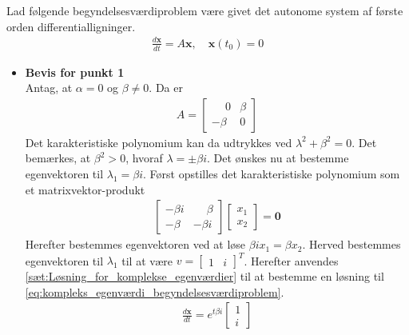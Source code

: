 \begin{bev} \textbf{}
\newline
Lad følgende begyndelsesværdiproblem være givet det autonome system af første orden differentialligninger.
    \begin{align}
        \frac{d\textbf{x}}{dt}=A\textbf{x}, \quad \textbf{x}(t_0)=0 \label{eq:kompleks_egenværdi_begyndelsesværdiproblem}
    \end{align}
\begin{itemize}
    \item[] \textbf{Bevis for punkt 1}\\
    Antag, at $\alpha = 0$ og $\beta \neq 0$. Da er
    \begin{align*}
        A = \begin{bmatrix}
            \phantom{-}0 & \beta \\
            -\beta & 0
    \end{bmatrix}
    \end{align*}
    Det karakteristiske polynomium kan da udtrykkes ved $\lambda^2+\beta^2=0$. Det bemærkes, at $\beta^2>0$, hvoraf $\lambda=\pm\beta i$. Det ønskes nu at bestemme egenvektoren til $\lambda_1 = \beta i$. Først opstilles det karakteristiske polynomium som et matrixvektor-produkt %
    \begin{align*}
        \begin{bmatrix}
            -\beta i & \phantom{-}\beta \\
            -\beta & -\beta i 
        \end{bmatrix}
        \begin{bmatrix}
            x_1 \\ x_2
        \end{bmatrix}
        =
        \textbf{0}
    \end{align*}
    Herefter bestemmes egenvektoren ved at løse $\beta i x_1=\beta x_2$. Herved bestemmes egenvektoren til $\lambda_1$ til at være $v=\begin{bmatrix} 1 & i\end{bmatrix}^T$. Herefter anvendes \autoref{sæt:Løsning_for_komplekse_egenværdier} til at bestemme en løsning til \eqref{eq:kompleks_egenværdi_begyndelsesværdiproblem}.
    \begin{align} \label{eq:kompleks_egenværdi_bevis_1}
        \frac{d\textbf{x}}{dt}=e^{t\beta i}\begin{bmatrix} 1 \\ i \end{bmatrix}

\end{align}
\end{itemize}
\end{bev}
